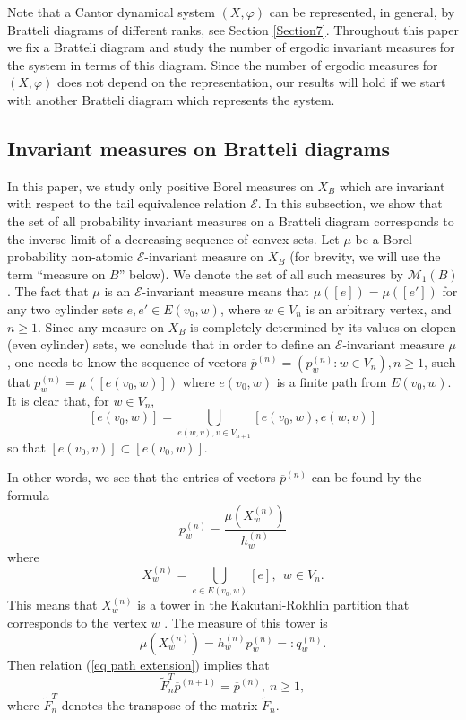 \documentclass[11pt, english, reqno]{amsart}
\theoremstyle{definition}
\theoremstyle{remark}
\theoremstyle{plain}
\def\ov{\overline}
\def\tl{\widetilde}
\numberwithin{equation}{section}
\begin{document}
Note that a Cantor dynamical system $(X, \varphi)$ can be represented, in general, by Bratteli diagrams of different ranks, see Section \ref{Section7}. Throughout this paper we fix a Bratteli diagram and study the number of ergodic invariant measures for the system in terms of this diagram. Since the number of ergodic measures for $(X, \varphi)$ does not depend on the representation, our results will hold if we start with another Bratteli diagram which represents the system.



\subsection{Invariant measures on Bratteli diagrams}

In this paper, we study only positive Borel measures on $X_B$ which
are invariant  with respect to the tail equivalence relation $\mathcal{E}$.
In this subsection, we show that the set of all probability invariant measures
on a Bratteli diagram
corresponds to the inverse limit of a decreasing  sequence of convex sets.
Let $\mu$ be a Borel probability non-atomic $\mathcal E$-invariant
  measure on $X_B$ (for brevity, we will use the term
  ``measure on $B$'' below). We denote the set of all such measures
   by $\mathcal{M}_1(B)$.
   The   fact that $\mu$ is an
   $\mathcal E$-invariant measure
 means that  $\mu([e]) = \mu([e'])$ for any two cylinder sets
 $e,e' \in  E(v_0, w)$, where $w \in  V_n$ is an arbitrary vertex, and
 $n \geq1$.   Since any measure on $X_B$ is completely determined
  by its  values  on  clopen (even cylinder) sets, we conclude that in order to
  define an  $\mathcal E$-invariant measure $\mu$, one needs to
   know the  sequence   of vectors  $\ov p^{(n)} = (p_w^{(n)} :
   w \in V_n), n  \geq 1$,  such that $p_w^{(n)} =  \mu([e(v_0,w)])$
    where  $e(v_0,w)$ is a finite path
 from $E(v_0,w)$. It is clear that, for $w \in V_n$,
\begin{equation}\label{eq path extension}
[e(v_0, w)] = \bigcup_{e(w, v), v \in V_{n+1}} [e(v_0, w), e(w, v)]
\end{equation}
so that $[e(v_0, v)] \subset [e(v_0, w)]$.

In other words, we see that the entries of  vectors $\ov p^{(n)}$ can
 be  found by the formula
$$
p_w^{(n)} = \frac{\mu(X_w^{(n)})}{h_w^{(n)}}
$$
where
\begin{equation}\label{eq tower X}
X_w^{(n)} = \bigcup_{e \in E(v_0,w)} [e], \ \ w \in V_n.
\end{equation}
This means that $X_w^{(n)}$ is a tower in the Kakutani-Rokhlin
  partition   that   corresponds to the vertex $w$
   \cite{HermanPutnamSkau1992}.  The
  measure of this tower is
 \begin{equation}\label{eq tower measure}
  \mu(X_w^{(n)}) = h_w^{(n)}p_w^{(n)} =: q_w^{(n)}.
 \end{equation}
 Then relation (\ref{eq path extension}) implies that
\begin{equation}\label{formula for measures}
\tl F_n^T \ov p^{(n+1)} = \ov p^{(n)}, \ n\geq 1,
\end{equation}
where  $\tl F_n^T$ denotes the transpose of the matrix $\tl F_n$.
\end{document}
